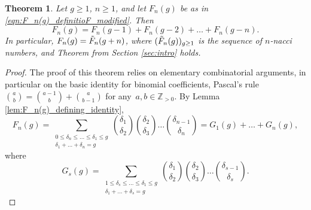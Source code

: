 \documentclass[11pt]{amsart}
\numberwithin{equation}{section}
\theoremstyle{plain}
\newcommand{\Z}{\mathbb{Z}}
\newcommand{\<}{\left \langle}
\renewcommand{\>}{\right \rangle}
\newtheorem{thm}{Theorem}[section]
\theoremstyle{definition}
\theoremstyle{remark}
\begin{document}
\begin{thm} 
Let $g \geq 1$, $n \geq 1$, and let $F_n(g)$ be as in \eqref{eqn:F_n(g)_definitioF_modified}. Then $$F_n(g) = F_n(g - 1) + F_n(g - 2) + \ldots + F_n(g - n).$$
In particular, $F_n(g) = \Tilde{F}_n(g + n)$, where $(\Tilde{F}_n(g))_{g \geq 1}$ is the sequence of $n$-nacci numbers, and Theorem from Section \ref{sec:intro} holds. 
\end{thm}

\begin{proof}
The proof of this theorem relies on elementary combinatorial arguments, in particular on the basic identity for binomial coefficients, Pascal’s rule ${a \choose b} = {a - 1 \choose b} + {a \choose b - 1}$ for any~${a, b \in \Z_{>0}}$. 
By Lemma \ref{lem:F_n(g)_defining_identity}, 
\begin{equation}
F_n(g) = \sum_{\substack{0 \leq \delta_n \leq \ldots \leq  \delta_1 \leq g \\ \delta_1 + \ldots + \delta_n = g}}  {\delta_1 \choose \delta_2}{\delta_2 \choose \delta_3}\ldots {\delta_{n -1} \choose \delta_{n}} = G_1(g) + \ldots + G_n(g),    \label{eqn:F_n(g)}
\end{equation}
where $$G_s(g) =  \sum_{\substack{1 \leq \delta_s \leq \ldots \leq  \delta_1 \leq g \\ \delta_1 + \ldots + \delta_s = g}}  {\delta_1 \choose \delta_2}{\delta_2 \choose \delta_3}\ldots {\delta_{s -1} \choose \delta_{s}}.$$



\end{proof}
\end{document}
